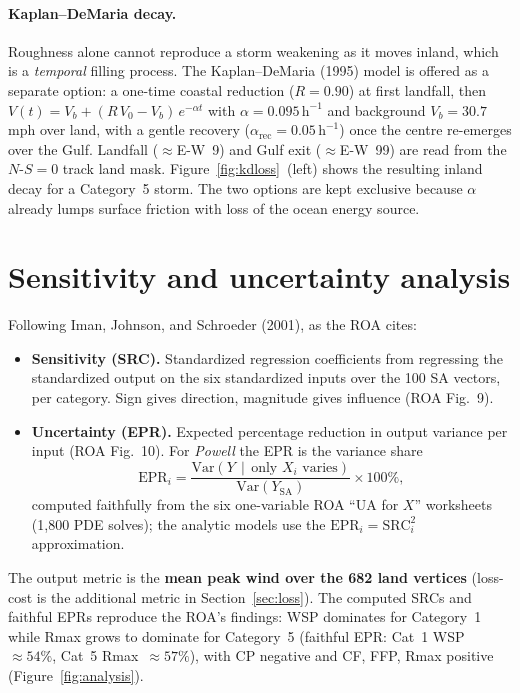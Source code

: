 \documentclass[11pt]{article}
\begin{document}
\paragraph{Kaplan--DeMaria decay.}
Roughness alone cannot reproduce a storm weakening as it moves inland, which is
a \emph{temporal} filling process. The Kaplan--DeMaria (1995) model is offered as
a separate option: a one-time coastal reduction ($R=0.90$) at first landfall, then
$V(t)=V_b+(R\,V_0-V_b)\,e^{-\alpha t}$ with $\alpha=0.095\,\text{h}^{-1}$ and
background $V_b=30.7$\,mph over land, with a gentle recovery
($\alpha_{\text{rec}}=0.05\,\text{h}^{-1}$) once the centre re-emerges over the
Gulf. Landfall ($\approx$E-W~9) and Gulf exit ($\approx$E-W~99) are read from the
$N$-$S=0$ track land mask. Figure~\ref{fig:kdloss}~(left) shows the resulting
inland decay for a Category~5 storm. The two options are kept exclusive because
$\alpha$ already lumps surface friction with loss of the ocean energy source.

\section{Sensitivity and uncertainty analysis}\label{sec:sa}
Following Iman, Johnson, and Schroeder (2001), as the ROA cites:
\begin{itemize}
\item \textbf{Sensitivity (SRC).} Standardized regression coefficients from
regressing the standardized output on the six standardized inputs over the 100
SA vectors, per category. Sign gives direction, magnitude gives influence
(ROA Fig.~9).
\item \textbf{Uncertainty (EPR).} Expected percentage reduction in output
variance per input (ROA Fig.~10). For \emph{Powell} the EPR is the variance share
\[
\text{EPR}_i=\frac{\mathrm{Var}\!\left(Y\,\middle|\,\text{only }X_i\text{ varies}\right)}
{\mathrm{Var}(Y_{\text{SA}})}\times100\%,
\]
computed faithfully from the six one-variable ROA ``UA for $X$'' worksheets
(1{,}800 PDE solves); the analytic models use the
$\text{EPR}_i=\text{SRC}_i^2$ approximation.
\end{itemize}
The output metric is the \textbf{mean peak wind over the 682 land vertices}
(loss-cost is the additional metric in Section~\ref{sec:loss}). The computed
SRCs and faithful EPRs reproduce the ROA's findings: WSP dominates for
Category~1 while Rmax grows to dominate for Category~5 (faithful EPR: Cat~1
WSP~$\approx54\%$, Cat~5 Rmax~$\approx57\%$), with CP negative and CF, FFP, Rmax
positive (Figure~\ref{fig:analysis}).
\end{document}
